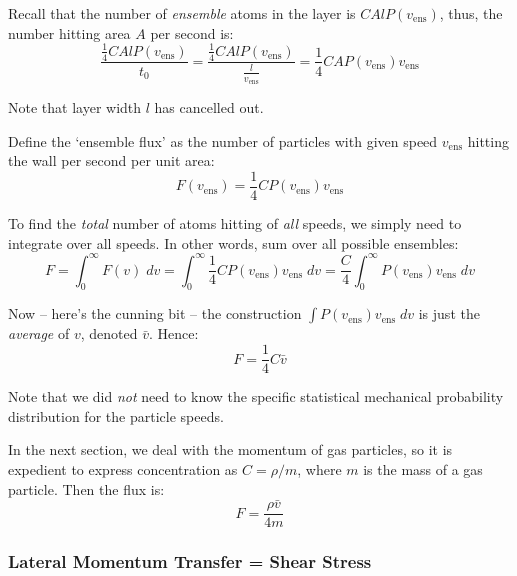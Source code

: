 \documentclass[a4paper]{report}
\newcommand{\vens}{\ensuremath{v_{\mathrm{ens}}}}
\begin{document}
\vspace{1em}
Recall that the number of \emph{ensemble} atoms in the layer is $ C A l P(\vens) $,
thus, the number hitting area $A$ per second is:
\begin{equation}
\frac{\frac{1}{4} C A l P(\vens)  }{t_0} 
 = \frac{ \frac{1}{4} C A l P(\vens)}{ \frac{l}{\vens} } =
 \frac{1}{4} C A P(\vens) \vens
\end{equation}

Note that layer width $l$ has cancelled out.

\vspace{1em}
Define the `ensemble flux' as the number of particles with given speed $\vens$ hitting the wall per second per unit area:
\begin{equation}
F(\vens) = \frac{1}{4} C P(\vens) \vens
\end{equation}

\vspace{1em}
To find the \emph{total} number of atoms hitting of \emph{all} speeds, we simply need to integrate over all speeds.  In other words, sum over all possible ensembles:
\begin{equation}
F = \int_{0}^{\infty} F(v) \; dv = \int_{0}^{\infty} \frac{1}{4} C P(\vens) \vens \; dv = \frac{C}{4} \int_{0}^{\infty} P(\vens) \vens \; dv
\end{equation}

Now -- here's the cunning bit -- the construction $ \int P(\vens) \vens \; dv$ is just the \emph{average} of $v$, denoted $\bar{v}$. Hence:
\begin{equation}
F = \frac{1}{4} C \bar{v}
\end{equation}


Note that we did \emph{not} need to know the specific statistical mechanical probability distribution for the particle speeds.

\vspace*{1em}
In the next section, we deal with the momentum of gas particles, so it is expedient to express concentration as $C = \rho/m$, where $m$ is the mass of a gas particle.  Then the flux is:
\begin{equation}
F = \frac{\rho \bar{v}}{4 m}
\end{equation}

\subsubsection*{Lateral Momentum Transfer = Shear Stress}
\end{document}

